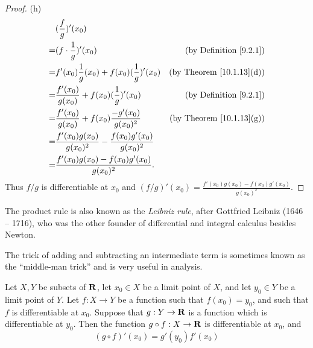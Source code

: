 \begin{proof}{(h)}
    \begin{align*}
          & (\frac{f}{g})'(x_0)                                                                                      \\
        = & (f \cdot \frac{1}{g})'(x_0)                                       & \text{(by Definition \ref{9.2.1})}   \\
        = & f'(x_0) \frac{1}{g}(x_0) + f(x_0) (\frac{1}{g})'(x_0)             & \text{(by Theorem \ref{10.1.13}(d))} \\
        = & \frac{f'(x_0)}{g(x_0)} + f(x_0) (\frac{1}{g})'(x_0)               & \text{(by Definition \ref{9.2.1})}   \\
        = & \frac{f'(x_0)}{g(x_0)} + f(x_0) \frac{-g'(x_0)}{g(x_0)^2}         & \text{(by Theorem \ref{10.1.13}(g))} \\
        = & \frac{f'(x_0) g(x_0)}{g(x_0)^2} - \frac{f(x_0) g'(x_0)}{g(x_0)^2}                                        \\
        = & \frac{f'(x_0) g(x_0) - f(x_0) g'(x_0)}{g(x_0)^2}.                                                        \\
    \end{align*}
    Thus \(f / g\) is differentiable at \(x_0\) and \((f / g)'(x_0) = \frac{f'(x_0) g(x_0) - f(x_0) g'(x_0)}{g(x_0)^2}\).
\end{proof}

\begin{remark}\label{10.1.14}
    The product rule is also known as the \emph{Leibniz rule}, after Gottfried Leibniz (1646 -- 1716), who was the other founder of differential and integral calculus besides Newton.
\end{remark}

\begin{note}
    The trick of adding and subtracting an intermediate term is sometimes known as the ``middle-man trick'' and is very useful in analysis.
\end{note}

\begin{theorem}\label{10.1.15}
    Let \(X, Y\) be subsets of \(\mathbf{R}\), let \(x_0 \in X\) be a limit point of \(X\), and let \(y_0 \in Y\) be a limit point of \(Y\).
    Let \(f : X \to Y\) be a function such that \(f(x_0) = y_0\), and such that \(f\) is differentiable at \(x_0\).
    Suppose that \(g : Y \to \mathbf{R}\) is a function which is differentiable at \(y_0\).
    Then the function \(g \circ f : X \to \mathbf{R}\) is differentiable at \(x_0\), and
    \[
        (g \circ f)'(x_0) = g'(y_0) f'(x_0)
    \]
\end{theorem}

